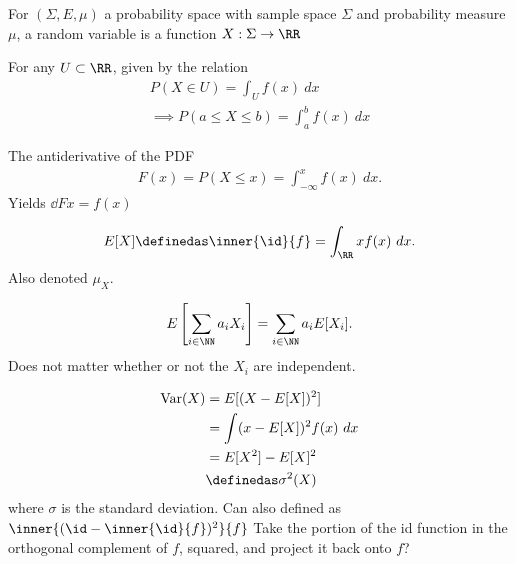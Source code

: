 \begin{definition}

For \((\Sigma, E, \mu)\) a probability space with sample space
\(\Sigma\) and probability measure \(\mu\), a random variable is a
function \(X: \Sigma \to \RR\)

\end{definition}

\begin{definition}

For any \(U \subset \RR\), given by the relation
\begin{align*}
P(X \in U) = \int_U f(x) ~dx \\
\implies P(a \leq X \leq b) = \int_a^b f(x) ~dx
\end{align*}

\end{definition}

\begin{definition}

The antiderivative of the PDF
\begin{align*}  
F(x) = P(X \leq x) = \int_{-\infty}^x f(x) ~dx
.\end{align*} Yields \(\dd{F}{x} = f(x)\)

\end{definition}

\begin{definition}

\begin{align*}  
E[X] \definedas \inner{\id}{f} = \int_\RR x f(x) ~dx
.\end{align*} Also denoted \(\mu_X\).

\end{definition}

\begin{proposition}

\begin{align*}  
E\left[\sum_{i\in\NN} a_i X_i\right] = \sum_{i\in\NN} a_i E[X_i]
.\end{align*} Does not matter whether or not the \(X_i\) are
independent.

\end{proposition}

\begin{definition}[Variance]

\begin{align*}
\mathrm{Var}(X) &= E[(X - E[X])^2] \\
&= \int (x - E[X])^2 f(x) ~dx \\
&= E[X^2] - E[X]^2 \\
&\definedas \sigma^2(X)
\end{align*} where \(\sigma\) is the standard deviation. Can also
defined as \(\inner{(\id - \inner{\id}{f})^2}{f}\) Take the portion of
the id function in the orthogonal complement of \(f\), squared, and
project it back onto \(f\)? 

\end{definition}

